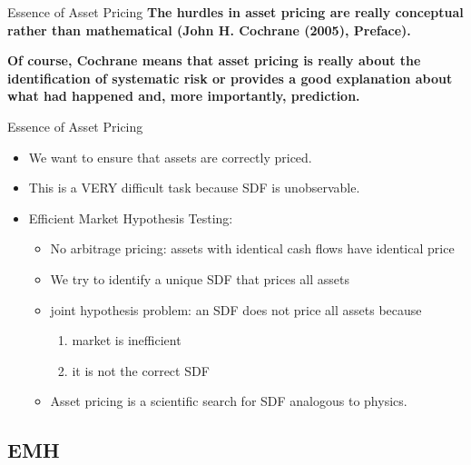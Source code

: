 \documentclass{beamer}
\begin{document}
\begin{frame}{Essence of Asset Pricing}
	\textbf{The hurdles in asset pricing are really conceptual rather than mathematical (John H. Cochrane (2005), Preface).}

	\vspace{10pt}
	\textbf{Of course, Cochrane means that asset pricing is really about the identification of systematic risk or provides a good explanation about what had happened and, more importantly, prediction.}
\end{frame}

\begin{frame}{Essence of Asset Pricing}
	\begin{itemize}
		\item We want to ensure that assets are correctly priced.
		\item This is a VERY difficult task because SDF is unobservable.
		\item Efficient Market Hypothesis Testing:
		\begin{itemize}
			\item No arbitrage pricing: assets with identical cash flows have identical price
			\item We try to identify a unique SDF that prices all assets
			\item joint hypothesis problem: an SDF does not price all assets because
			\begin{enumerate}
				\item market is
				inefficient
				\item it is not the correct SDF
			\end{enumerate}
			\item Asset pricing is a scientific search for SDF analogous to physics.
		\end{itemize}
	\end{itemize}
\end{frame}

\subsection{EMH}
\end{document}
